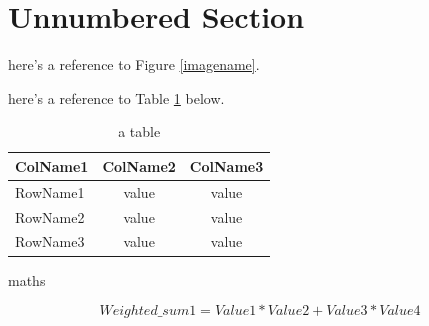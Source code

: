\documentclass[11pt, a4paper]{article}
\begin{document}
    \section*{Unnumbered Section} 

    here's a reference to Figure \ref{imagename}.

    here's a reference to Table \ref{tablename} below.
    
    \begin{table}[ht]
        \centering
        \begin{tabular}{|l|c|c|}
            \hline
            ColName1&ColName2&ColName3 \\
            \hline
            RowName1 & value & value \\
            RowName2 & value & value \\
            RowName3 & value & value \\
            \hline
        \end{tabular}
        \caption{a table}
        \label{tablename}
    \end{table}


    maths

    $$ Weighted\_sum1 = Value1 * Value2 + Value3 * Value4 $$

    \printbibliography

    \nocite{*}
\end{document}
